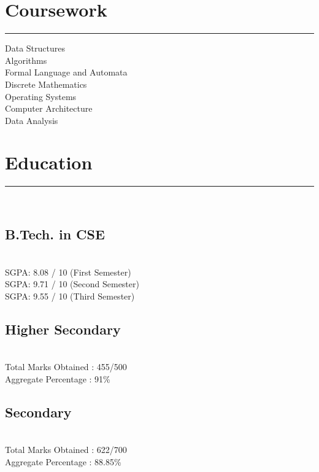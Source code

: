 \documentclass[]{debjitpal-resume}
\begin{document}
\begin{minipage}[t]{0.35\textwidth}
\section{Coursework}
\noindent\rule{5cm}{0.4pt}

Data Structures\\
Algorithms\\
Formal Language and Automata \\
Discrete Mathematics\\
Operating Systems\\
Computer Architecture\\
Data Analysis
\sectionsep
\section{Education} 
\noindent\rule{5cm}{0.4pt}\\
\subsection{B.Tech. in CSE}
 \\
SGPA: 8.08 / 10 (First Semester)\\
SGPA: 9.71 / 10 (Second Semester)\\
SGPA: 9.55 / 10 (Third Semester)\\
\vspace{8pt}
\subsection{Higher Secondary}
\\
Total Marks Obtained : 455/500 \\
Aggregate Percentage : 91\%\\
\vspace{8pt}
\subsection{Secondary}
\\
Total Marks Obtained : 622/700 \\
Aggregate Percentage : 88.85\%
\sectionsep
%
%
\end{minipage} 
\end{document}
